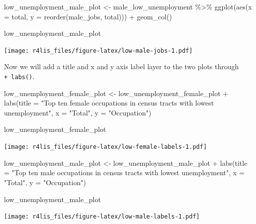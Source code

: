\documentclass[
  krantz2]{krantz}
\makeatletter
\newenvironment{Shaded}{\begin{snugshade}}{\end{snugshade}}
\newcommand{\AttributeTok}[1]{\textcolor[rgb]{0.61,0.61,0.61}{#1}}
\newcommand{\FunctionTok}[1]{\textcolor[rgb]{0,0,0}{#1}}
\newcommand{\NormalTok}[1]{#1}
\newcommand{\OtherTok}[1]{\textcolor[rgb]{0.37,0.37,0.37}{#1}}
\newcommand{\SpecialCharTok}[1]{\textcolor[rgb]{0,0,0}{#1}}
\newcommand{\StringTok}[1]{\textcolor[rgb]{0.5,0.5,0.5}{#1}}
\newenvironment{kframe}{%
\medskip{}
\setlength{\fboxsep}{.8em}
 \def\at@end@of@kframe{}%
 \ifinner\ifhmode%
  \def\at@end@of@kframe{\end{minipage}}%
  \begin{minipage}{\columnwidth}%
 \fi\fi%
 \def\FrameCommand##1{\hskip\@totalleftmargin \hskip-\fboxsep
 \colorbox{shadecolor}{##1}\hskip-\fboxsep
     \hskip-\linewidth \hskip-\@totalleftmargin \hskip\columnwidth}%
 \MakeFramed {\advance\hsize-\width
   \@totalleftmargin\z@ \linewidth\hsize
   \@setminipage}}%
 {\par\unskip\endMakeFramed%
 \at@end@of@kframe}
\renewenvironment{Shaded}{\begin{kframe}}{\end{kframe}}
\makeatother
\begin{document}
\begin{Shaded}
\begin{Highlighting}[]
\NormalTok{low\_unemployment\_male\_plot }\OtherTok{\textless{}{-}}\NormalTok{ male\_low\_unemployment }\SpecialCharTok{\%\textgreater{}\%}
  \FunctionTok{ggplot}\NormalTok{(}\FunctionTok{aes}\NormalTok{(}\AttributeTok{x =}\NormalTok{ total, }\AttributeTok{y =} \FunctionTok{reorder}\NormalTok{(male\_jobs, total))) }\SpecialCharTok{+}
  \FunctionTok{geom\_col}\NormalTok{()}

\NormalTok{low\_unemployment\_male\_plot}
\end{Highlighting}
\end{Shaded}

\texttt{[image: r4lis\_files/figure-latex/low-male-jobs-1.pdf]}

Now we will add a title and x and y axis label layer to the two plots through \texttt{+\ labs()}.

\begin{Shaded}
\begin{Highlighting}[]
\NormalTok{low\_unemployment\_female\_plot }\OtherTok{\textless{}{-}}\NormalTok{ low\_unemployment\_female\_plot }\SpecialCharTok{+}
  \FunctionTok{labs}\NormalTok{(}\AttributeTok{title =} \StringTok{"Top ten female occupations in census tracts with lowest unemployment"}\NormalTok{,}
       \AttributeTok{x =} \StringTok{"Total"}\NormalTok{, }\AttributeTok{y =} \StringTok{"Occupation"}\NormalTok{)}

\NormalTok{low\_unemployment\_female\_plot}
\end{Highlighting}
\end{Shaded}

\texttt{[image: r4lis\_files/figure-latex/low-female-labels-1.pdf]}

\begin{Shaded}
\begin{Highlighting}[]
\NormalTok{low\_unemployment\_male\_plot }\OtherTok{\textless{}{-}}\NormalTok{ low\_unemployment\_male\_plot }\SpecialCharTok{+}
  \FunctionTok{labs}\NormalTok{(}\AttributeTok{title =} \StringTok{"Top ten male occupations in census tracts with lowest unemployment"}\NormalTok{,}
       \AttributeTok{x =} \StringTok{"Total"}\NormalTok{, }\AttributeTok{y =} \StringTok{"Occupation"}\NormalTok{)}

\NormalTok{low\_unemployment\_male\_plot}
\end{Highlighting}
\end{Shaded}

\texttt{[image: r4lis\_files/figure-latex/low-male-labels-1.pdf]}
\end{document}
